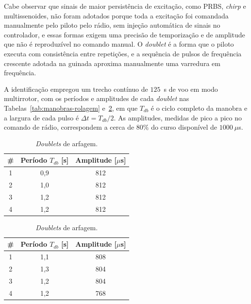 {\color{blue}Cabe observar que sinais de maior persistência de excitação, como PRBS, \textit{chirp} e multissenoides, não foram adotados porque toda a excitação foi comandada manualmente pelo piloto pelo rádio, sem injeção automática de sinais no controlador, e essas formas exigem uma precisão de temporização e de amplitude que não é reproduzível no comando manual. O \textit{doublet} é a forma que o piloto executa com consistência entre repetições, e a sequência de pulsos de frequência crescente adotada na guinada aproxima manualmente uma varredura em frequência.}

{\color{blue}A identificação empregou um trecho contínuo de $125$~s de voo em modo multirrotor, com os períodos e amplitudes de cada \textit{doublet} nas Tabelas~\ref{tab:manobras-rolagem} e~\ref{tab:manobras-arfagem}, em que $T_{db}$ é o ciclo completo da manobra e a largura de cada pulso é $\Delta t = T_{db}/2$. As amplitudes, medidas de pico a pico no comando de rádio, correspondem a cerca de $80\%$ do curso disponível de $1000\ \mu$s.}

\begin{table}[H]
\centering
\begin{minipage}{0.48\textwidth}
\centering
\caption{\color{blue}\textit{Doublets} de rolagem.}
\label{tab:manobras-rolagem}
\footnotesize\color{blue}
\begin{tabular}{c c c}
\toprule
\# & Período $T_{db}$ [s] & Amplitude [$\mu$s] \\
\midrule
1 & 0,9 & 812 \\
2 & 1,0 & 812 \\
3 & 1,2 & 812 \\
4 & 1,2 & 812 \\
\bottomrule
\end{tabular}
\end{minipage}
\hfill
\begin{minipage}{0.48\textwidth}
\centering
\caption{\color{blue}\textit{Doublets} de arfagem.}
\label{tab:manobras-arfagem}
\footnotesize\color{blue}
\begin{tabular}{c c c}
\toprule
\# & Período $T_{db}$ [s] & Amplitude [$\mu$s] \\
\midrule
1 & 1,1 & 808 \\
2 & 1,3 & 804 \\
3 & 1,2 & 804 \\
4 & 1,2 & 768 \\
\bottomrule
\end{tabular}
\end{minipage}
\end{table}


